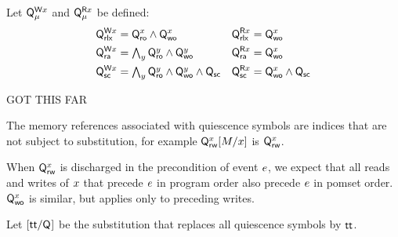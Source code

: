 \begin{definition}
  Let $\mathsf{Q}_{\mu}^{\mathsf{W}x}$ and $\mathsf{Q}_{\mu}^{\mathsf{R}x}$ be defined:
  \begin{align*}
    \mathsf{Q}_{{\mathsf{rlx}}}^{\mathsf{W}x}&=\mathsf{Q}_{\mathsf{ro}}^{x}\land\mathsf{Q}_{\mathsf{wo}}^{x}
    &\mathsf{Q}_{{\mathsf{rlx}}}^{\mathsf{R}x}&=\mathsf{Q}_{\mathsf{wo}}^{x}
    \\
    \mathsf{Q}_{{\mathsf{ra}}}^{\mathsf{W}x}&=\textstyle\bigwedge_y \mathsf{Q}_{\mathsf{ro}}^{y}\land\mathsf{Q}_{\mathsf{wo}}^{y}
    &\mathsf{Q}_{{\mathsf{ra}}}^{\mathsf{R}x}&=\mathsf{Q}_{\mathsf{wo}}^{x}
    \\
    \mathsf{Q}_{{\mathsf{sc}}}^{\mathsf{W}x}&=\textstyle\bigwedge_y \mathsf{Q}_{\mathsf{ro}}^{y}\land\mathsf{Q}_{\mathsf{wo}}^{y} \land \mathsf{Q}_{\mathsf{sc}}
    &\mathsf{Q}_{{\mathsf{sc}}}^{\mathsf{R}x}&=\mathsf{Q}_{\mathsf{wo}}^{x}\land\mathsf{Q}_{\mathsf{sc}}
  \end{align*}
\end{definition}

GOT THIS FAR

The memory
references associated with quiescence symbols are indices that are not
subject to substitution, for example $\mathsf{Q}_{\mathsf{rw}}^{x}[M/x]$ is $\mathsf{Q}_{\mathsf{rw}}^{x}$.






When $\mathsf{Q}_{\mathsf{rw}}^{x}$ is discharged in the precondition of event $e$, we
expect that all reads and writes of $x$ that precede $e$ in program
order also precede $e$ in pomset order.
$\mathsf{Q}_{\mathsf{wo}}^{x}$ is similar, but applies only to preceding writes.

\begin{definition}
  Let $[\mathsf{tt}/\mathsf{Q}_{}]$ be the substitution that replaces all quiescence
  symbols by $\mathsf{tt}$.
\end{definition}

